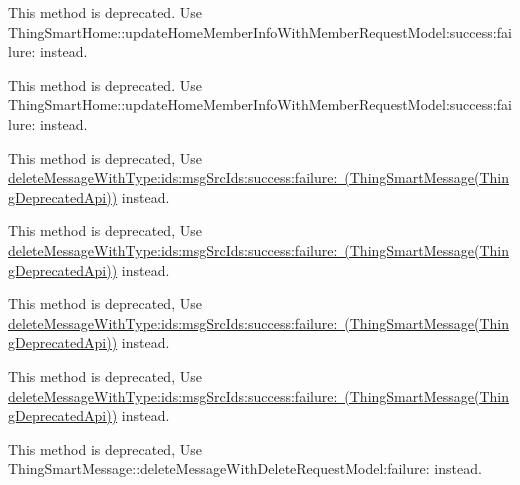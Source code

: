 \begin{DoxyRefList}
\label{deprecated__deprecated000032}%
%
This method is deprecated. Use Thing\+Smart\+Home\+::update\+Home\+Member\+Info\+With\+Member\+Request\+Model\+:success\+:failure\+: instead. 

\label{deprecated__deprecated000014}%
%
This method is deprecated. Use Thing\+Smart\+Home\+::update\+Home\+Member\+Info\+With\+Member\+Request\+Model\+:success\+:failure\+: instead.  
\item[(Thing\+Deprecated\+Api) Member \mbox{\hyperlink{category_thing_smart_message_07_thing_deprecated_api_08_a6fa118d620cb03c867e2c4aba4d233b2}{\mbox{[}Thing\+Smart\+Message(Thing\+Deprecated\+Api) delete\+Message\+:success\+:failure\+:\mbox{]}}} ]\label{deprecated__deprecated000175}%
%
This method is deprecated, Use \mbox{\hyperlink{category_thing_smart_message_07_thing_deprecated_api_08_a489dec9ea2398e107925e8617ba459df}{delete\+Message\+With\+Type\+:ids\+:msg\+Src\+Ids\+:success\+:failure\+: (\+Thing\+Smart\+Message(\+Thing\+Deprecated\+Api))}} instead. 

\label{deprecated__deprecated000182}%
%
This method is deprecated, Use \mbox{\hyperlink{category_thing_smart_message_07_thing_deprecated_api_08_a489dec9ea2398e107925e8617ba459df}{delete\+Message\+With\+Type\+:ids\+:msg\+Src\+Ids\+:success\+:failure\+: (\+Thing\+Smart\+Message(\+Thing\+Deprecated\+Api))}} instead. 

\label{deprecated__deprecated000189}%
%
This method is deprecated, Use \mbox{\hyperlink{category_thing_smart_message_07_thing_deprecated_api_08_a489dec9ea2398e107925e8617ba459df}{delete\+Message\+With\+Type\+:ids\+:msg\+Src\+Ids\+:success\+:failure\+: (\+Thing\+Smart\+Message(\+Thing\+Deprecated\+Api))}} instead. 

\label{deprecated__deprecated000196}%
%
This method is deprecated, Use \mbox{\hyperlink{category_thing_smart_message_07_thing_deprecated_api_08_a489dec9ea2398e107925e8617ba459df}{delete\+Message\+With\+Type\+:ids\+:msg\+Src\+Ids\+:success\+:failure\+: (\+Thing\+Smart\+Message(\+Thing\+Deprecated\+Api))}} instead.  
\item[(Thing\+Deprecated\+Api) Member \mbox{\hyperlink{category_thing_smart_message_07_thing_deprecated_api_08_a489dec9ea2398e107925e8617ba459df}{\mbox{[}Thing\+Smart\+Message(Thing\+Deprecated\+Api) delete\+Message\+With\+Type\+:ids\+:msg\+Src\+Ids\+:success\+:failure\+:\mbox{]}}} ]\label{deprecated__deprecated000184}%
%
This method is deprecated, Use Thing\+Smart\+Message\+::delete\+Message\+With\+Delete\+Request\+Model\+:failure\+: instead. 


\end{DoxyRefList}
